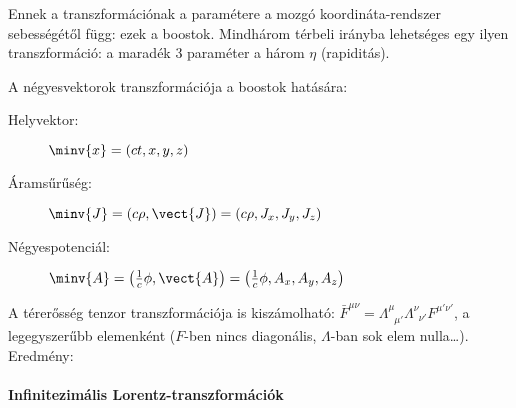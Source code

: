     Ennek a transzformációnak a paramétere a mozgó koordináta-rendszer sebességétől függ: ezek a boostok.
   Mindhárom térbeli irányba lehetséges egy ilyen transzformáció: a maradék 3 paraméter a három $\eta$ (rapiditás). 
    
    A négyesvektorok transzformációja a boostok hatására:
    \begin{description}
     \item[Helyvektor:] $\minv{x}=(ct,x,y,z)$
     \item[Áramsűrűség:] $\minv{J}=(c\rho,\vect{J})=(c\rho,J_x,J_y,J_z)$
     \item[Négyespotenciál:] $\minv{A}=\left(\frac{1}{c}\phi,\vect{A}\right)=\left(\frac{1}{c}\phi,A_x,A_y,A_z\right)$
    \end{description}
    A térerősség tenzor transzformációja is kiszámolható: $\bar{F}^{\mu\nu}=\Lambda^\mu_{\phantom{\mu}\mu'}\Lambda^\nu_{\phantom{\nu}\nu'} F^{\mu'\nu'}$, a legegyszerűbb elemenként ($F$-ben nincs diagonális, $\Lambda$-ban sok elem nulla\dots).
   Eredmény:
   
   \paragraph{Infinitezimális Lorentz-transzformációk}
    
